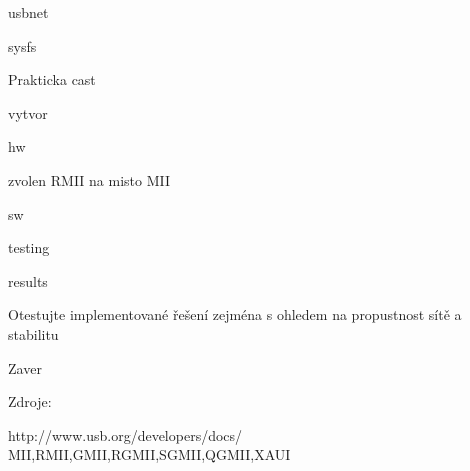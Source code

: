 \secc usbnet

\secc sysfs

\sec Prakticka cast

\secc vytvor

\secc hw

\secc zvolen RMII na misto MII

\secc sw

\secc testing

\secc results

\secc Otestujte implementované řešení zejména s ohledem na propustnost sítě a stabilitu

\chap Zaver


\chap Zdroje:

http://www.usb.org/developers/docs/
MII,RMII,GMII,RGMII,SGMII,QGMII,XAUI
